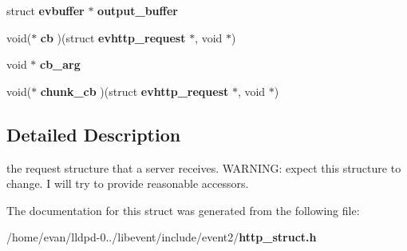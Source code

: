 \begin{DoxyCompactItemize}
\item 
struct {\bf evbuffer} $\ast$ {\bfseries output\-\_\-buffer}\label{structevhttp__request_a3b78abf045f4ac7551287d298f3e53b7}

\item 
void($\ast$ {\bfseries cb} )(struct {\bf evhttp\-\_\-request} $\ast$, void $\ast$)\label{structevhttp__request_a075b5a6108110ecc4f8c80c1606b1c2e}

\item 
void $\ast$ {\bfseries cb\-\_\-arg}\label{structevhttp__request_aa2a0fc874870115f7d31aabcbb53ec0b}

\item 
void($\ast$ {\bfseries chunk\-\_\-cb} )(struct {\bf evhttp\-\_\-request} $\ast$, void $\ast$)\label{structevhttp__request_a1f002a58a1a7bc05a64a78d002619125}

\end{DoxyCompactItemize}


\subsection{\-Detailed \-Description}
the request structure that a server receives. \-W\-A\-R\-N\-I\-N\-G\-: expect this structure to change. \-I will try to provide reasonable accessors. 

\-The documentation for this struct was generated from the following file\-:\begin{DoxyCompactItemize}
\item 
/home/evan/lldpd-\/0../libevent/include/event2/{\bf http\-\_\-struct.\-h}\end{DoxyCompactItemize}
